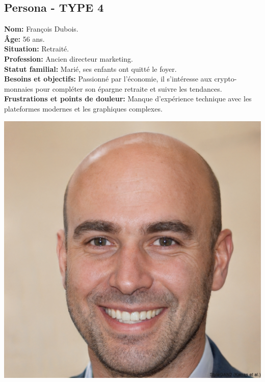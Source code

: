 \documentclass[a4paper,11pt]{article}
\begin{document}
\subsection{Persona - TYPE 4}
\begin{minipage}{0.6\textwidth} %
\textbf{Nom:} François Dubois.\\
\textbf{Âge:} 56 ans.\\
\textbf{Situation:} Retraité.\\
\textbf{Profession:} Ancien directeur marketing.\\
\textbf{Statut familial:} Marié, ses enfants ont quitté le foyer.\\
\textbf{Besoins et objectifs:} Passionné par l’économie, il s’intéresse aux crypto-monnaies pour compléter son épargne retraite et suivre les tendances.\\
\textbf{Frustrations et points de douleur:} Manque d’expérience technique avec les plateformes modernes et les graphiques complexes.\\
\end{minipage}%
\hspace{1cm}
\begin{minipage}{0.3\textwidth} %
    \begin{center}
        \includegraphics[width=\textwidth]{images/francois_50_ans.jpeg} %
    \end{center}
\end{minipage}
\end{document}
